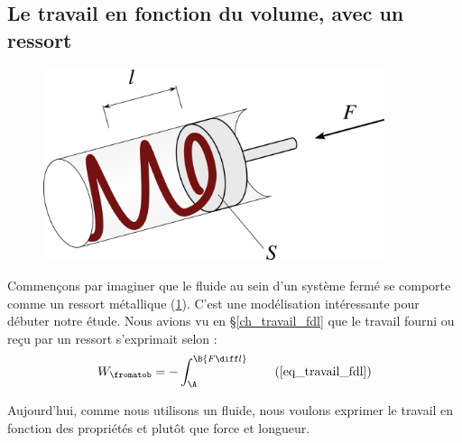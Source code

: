 	\subsection{Le travail en fonction du volume, avec un ressort}
	\label{ch_travail_pdv}

		\begin{figure}
			\begin{center}
				\includegraphics[width=10cm]{images/travail_cylindre_1.png}
			\end{center}
			\label{fig_piston_ressort}
		\end{figure}

		Commençons par imaginer que le fluide au sein d’un système fermé se comporte comme un ressort métallique (\cref{fig_piston_ressort}). C’est une modélisation intéressante pour débuter notre étude. Nous avions vu en \S\ref{ch_travail_fdl} que le travail fourni ou reçu par un ressort s’exprimait selon :
		\begin{equation*}
			W_\fromatob = - \int_\A^\B {F \diff l} \tag{\ref{eq_travail_fdl}}
		\end{equation*}

		Aujourd’hui, comme nous utilisons un fluide, nous voulons exprimer le travail en fonction des propriétés  et  plutôt que force et longueur.

